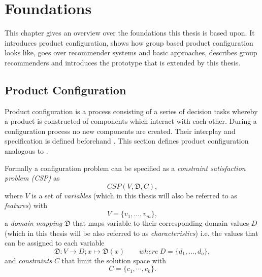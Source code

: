 \chapter{Foundations}
\label{ch:Foundations}

This chapter gives an overview over the foundations this thesis is based upon. It introduces product configuration, shows how group based product configuration looks like, goes over recommender systems and basic approaches, describes group recommenders and introduces the prototype that is extended by this thesis.

\section{Product Configuration}
\label{sec:Foundations:ProductConfiguration}

Product configuration is a process consisting of a series of decision tasks whereby a product is constructed of components which interact with each other. During a configuration process no new components are created. Their interplay and specification is defined beforehand \cite[~ pp. 42, 43]{sabinProductConfigurationFrameworksa1998}. This section defines product configuration analogous to \citeauthor{felfernigOpenConfiguration2014} \cite{felfernigOpenConfiguration2014}.

Formally a configuration problem can be specified as a \emph{constraint satisfaction problem (CSP)} \cite{tsangFoundationsConstraintSatisfaction1993} as 
\begin{equation} \label{eq:Foundations:ProductConfiguration:ConstraintSatisfactionProblem}
    CSP(V,\mathfrak{D},C),
\end{equation}
where $V$ is a set of \emph{variables} (which in this thesis will also be referred to as \emph{features}) with
\begin{equation} \label{eq:Foundations:ProductConfiguration:Variables}
    V = \{v_1, \dotsc, v_m\},
\end{equation}
a \emph{domain mapping} $\mathfrak{D}$ that maps variable to their corresponding domain values $D$ (which in this thesis will be also referred to as \emph{characteristics}) i.e. the values that can be assigned to each variable
\begin{equation}\label{eq:Foundations:ProductConfiguration:DomainMapping}
    \mathfrak{D} : V \to D; x \mapsto \mathfrak{D}(x) \qquad where \ D = \{d_1, \dotsc, d_o\},
\end{equation}
and \emph{constraints} $C$ that limit the solution space with 
\begin{equation}\label{eq:Foundations:ProductConfiguration:Constraints}
    C = \{c_1, \cdots, c_k\}.
\end{equation}

